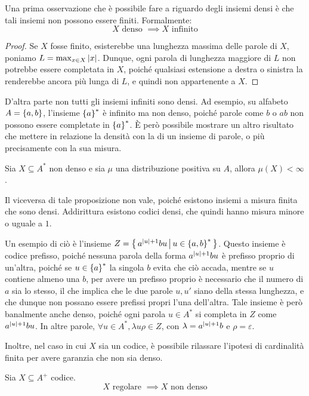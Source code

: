 Una prima osservazione che è possibile fare a riguardo degli insiemi densi è che tali insiemi non possono essere finiti.
Formalmente:
\[X \text{ denso } \implies X \text{ infinito}\]
\begin{proof}
  Se \(X\) fosse finito, esisterebbe una lunghezza massima delle parole di \(X\), poniamo \(L = \max_{x \in X} \left|x\right|\).
  Dunque, ogni parola di lunghezza maggiore di \(L\) non potrebbe essere completata in \(X\), poiché qualsiasi estensione a destra o sinistra la renderebbe ancora più lunga di \(L\), e quindi non appartenente a \(X\).
\end{proof}

D'altra parte non tutti gli insiemi infiniti sono densi. Ad esempio, su alfabeto \(A = \set{a,b}\), l'insieme \(\set{a}^*\) è infinito ma non denso, poiché parole come \(b\) o \(ab\) non possono essere completate in \(\set{a}^*\).
È però possibile mostrare un altro risultato che mettere in relazione la densità con la  di un insieme di parole, o più precisamente con la sua misura.

\begin{proposition}{}
  Sia \(X \subseteq A^*\) non denso e sia \(\mu\) una distribuzione positiva su \(A\), allora \(\mu(X) < \infty\).
\end{proposition}

Il viceversa di tale proposizione non vale, poiché esistono insiemi a misura finita che sono densi. Addirittura esistono codici densi, che quindi hanno misura minore o uguale a \(1\).

\begin{example}[label=ex:dense_code]{}
  Un esempio di ciò è l'insieme \(Z = \set{a^{\abs{u}+1}bu}[u \in \set{a,b}^*]\). Questo insieme è codice prefisso, poiché nessuna parola della forma \(a^{\left|u\right|+1}bu\) è prefisso proprio di un'altra,
  poiché se \(u \in \set{a}^*\) la singola \(b\) evita che ciò accada, mentre se \(u\) contiene almeno una \(b\), per avere un prefisso proprio è necessario che il numero di \(a\) sia lo stesso, il che implica che le due parole \(u, u'\) siano della stessa lunghezza, e che dunque non possano essere prefissi propri l'una dell'altra.
  Tale insieme è però banalmente anche denso, poiché ogni parola \(u \in A^*\) si completa in \(Z\) come \(a^{\left|u\right|+1}bu\). In altre parole, \(\forall u \in A^*, \lambda u \rho \in Z\), con \(\lambda = a^{\left|u\right|+1}b\) e \(\rho = \varepsilon\).
\end{example}

Inoltre, nel caso in cui \(X\) sia un codice, è possibile rilassare l'ipotesi di cardinalità finita per avere garanzia che non sia denso.
\begin{proposition}{}
  Sia \(X \subseteq A^+\) codice.
  \[ X \text{ regolare } \implies X \text{ non denso}\]
\end{proposition}

